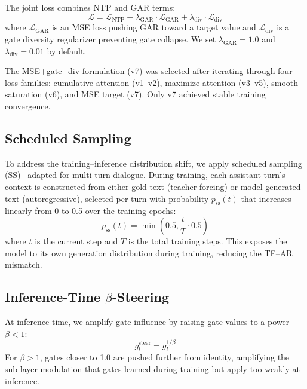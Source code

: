 \documentclass[11pt,a4paper]{article}
\begin{document}
The joint loss combines NTP and GAR terms:
\begin{equation}
\mathcal{L} = \mathcal{L}_{\text{NTP}} + \lambda_{\text{GAR}} \cdot \mathcal{L}_{\text{GAR}} + \lambda_{\text{div}} \cdot \mathcal{L}_{\text{div}}
\end{equation}
where $\mathcal{L}_{\text{GAR}}$ is an MSE loss pushing GAR toward a target value and $\mathcal{L}_{\text{div}}$ is a gate diversity regularizer preventing gate collapse. We set $\lambda_{\text{GAR}} = 1.0$ and $\lambda_{\text{div}} = 0.01$ by default.

The MSE+gate\_div formulation (v7) was selected after iterating through four loss families: cumulative attention (v1--v2), maximize attention (v3--v5), smooth saturation (v6), and MSE target (v7). Only v7 achieved stable training convergence.

\subsection{Scheduled Sampling}

To address the training--inference distribution shift, we apply scheduled sampling (SS)~\cite{bengio2015scheduled} adapted for multi-turn dialogue. During training, each assistant turn's context is constructed from either gold text (teacher forcing) or model-generated text (autoregressive), selected per-turn with probability $p_{\text{ss}}(t)$ that increases linearly from 0 to 0.5 over the training epochs:
\begin{equation}
p_{\text{ss}}(t) = \min\!\left(0.5, \frac{t}{T} \cdot 0.5\right)
\end{equation}
where $t$ is the current step and $T$ is the total training steps. This exposes the model to its own generation distribution during training, reducing the TF--AR mismatch.

\subsection{Inference-Time $\beta$-Steering}

At inference time, we amplify gate influence by raising gate values to a power $\beta < 1$:
\begin{equation}
g_l^{\text{steer}} = g_l^{1/\beta}
\end{equation}
For $\beta > 1$, gates closer to 1.0 are pushed further from identity, amplifying the sub-layer modulation that gates learned during training but apply too weakly at inference.
\end{document}
